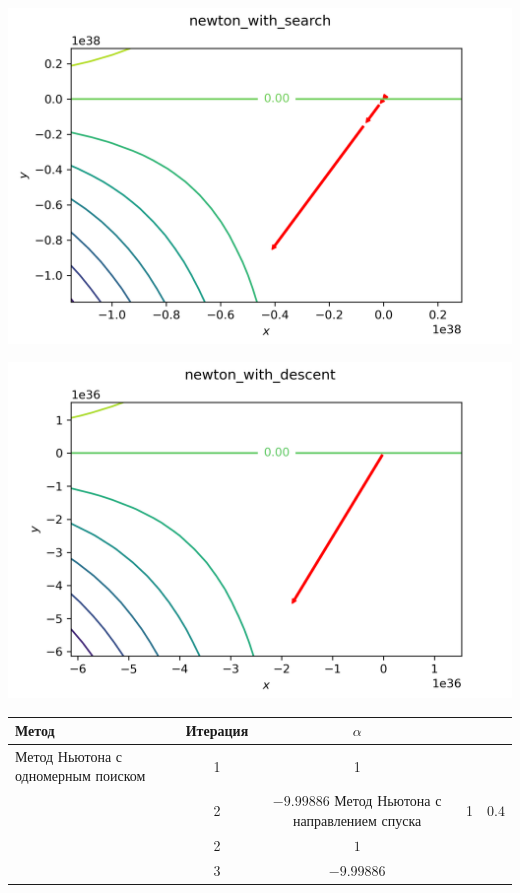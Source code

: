 \documentclass[english]{article}
\begin{document}
\begin{enumerate}
\begin{center}
    \includegraphics[scale=0.7]{plots/contours_newton_with_search_2.png}
  \end{center}
  \begin{center}
    \includegraphics[scale=0.7]{plots/contours_newton_with_descent_2.png}
  \end{center}
\begin{center}
  \begin{longtable}{l|cc}
    Метод & Итерация & \(\alpha\) \\
    \hline
    Метод Ньютона с одномерным поиском & 1 & 1 \\
    & 2 & \(-9.99886\)
    \hline
    Метод Ньютона с направлением спуска & 1 & \(0.4\) \\
    & 2 & \(1\) \\
    & 3 & \(-9.99886\)
  \end{longtable}
\end{center}

\end{enumerate}
\end{document}
